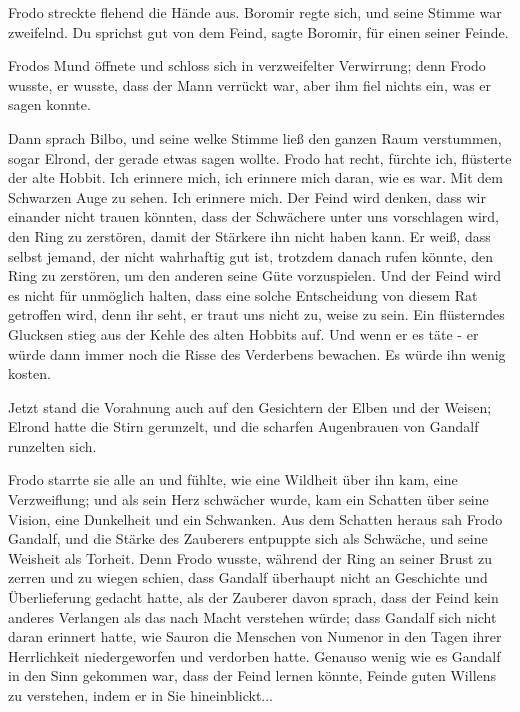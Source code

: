 Frodo streckte flehend die Hände aus. Boromir regte sich, und seine Stimme war
zweifelnd. \glqq Du sprichst gut von dem Feind\grqq{}, sagte Boromir, \glqq für
einen seiner Feinde.\grqq{}

Frodos Mund öffnete und schloss sich in verzweifelter Verwirrung; denn Frodo
wusste, er wusste, dass der Mann verrückt war, aber ihm fiel nichts ein, was er
sagen konnte.

Dann sprach Bilbo, und seine welke Stimme ließ den ganzen Raum verstummen, sogar
Elrond, der gerade etwas sagen wollte. \glqq Frodo hat recht, fürchte
ich\grqq{}, flüsterte der alte Hobbit. \glqq Ich erinnere mich, ich erinnere
mich daran, wie es war. Mit dem Schwarzen Auge zu sehen. Ich erinnere mich. Der
Feind wird denken, dass wir einander nicht trauen könnten, dass der Schwächere
unter uns vorschlagen wird, den Ring zu zerstören, damit der Stärkere ihn nicht
haben kann. Er weiß, dass selbst jemand, der nicht wahrhaftig gut ist, trotzdem
danach rufen könnte, den Ring zu zerstören, um den anderen seine Güte
vorzuspielen. Und der Feind wird es nicht für unmöglich halten, dass eine solche
Entscheidung von diesem Rat getroffen wird, denn ihr seht, er traut uns nicht
zu, weise zu sein.\grqq{} Ein flüsterndes Glucksen stieg aus der Kehle des alten
Hobbits auf. \glqq Und wenn er es täte - er würde dann immer noch die Risse des
Verderbens bewachen. Es würde ihn wenig kosten.\grqq{}

Jetzt stand die Vorahnung auch auf den Gesichtern der Elben und der Weisen;
Elrond hatte die Stirn gerunzelt, und die scharfen Augenbrauen von Gandalf
runzelten sich.

Frodo starrte sie alle an und fühlte, wie eine Wildheit über ihn kam, eine
Verzweiflung; und als sein Herz schwächer wurde, kam ein Schatten über seine
Vision, eine Dunkelheit und ein Schwanken. Aus dem Schatten heraus sah Frodo
Gandalf, und die Stärke des Zauberers entpuppte sich als Schwäche, und seine
Weisheit als Torheit. Denn Frodo wusste, während der Ring an seiner Brust zu
zerren und zu wiegen schien, dass Gandalf überhaupt nicht an Geschichte und
Überlieferung gedacht hatte, als der Zauberer davon sprach, dass der Feind kein
anderes Verlangen als das nach Macht verstehen würde; dass Gandalf sich nicht
daran erinnert hatte, wie Sauron die Menschen von Numenor in den Tagen ihrer
Herrlichkeit niedergeworfen und verdorben hatte. Genauso wenig wie es Gandalf in
den Sinn gekommen war, dass der Feind lernen könnte, Feinde guten Willens zu
verstehen, indem er in Sie hineinblickt...

